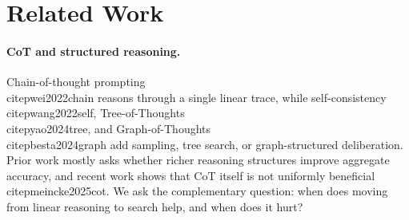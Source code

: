 \documentclass{article}
\begin{document}


\section{Related Work}
\label{sec:related}

\paragraph{CoT and structured reasoning.}
Chain-of-thought prompting~\\citep{wei2022chain} reasons through a single linear trace, while self-consistency~\\citep{wang2022self}, Tree-of-Thoughts~\\citep{yao2024tree}, and Graph-of-Thoughts~\\citep{besta2024graph} add sampling, tree search, or graph-structured deliberation. Prior work mostly asks whether richer reasoning structures improve aggregate accuracy, and recent work shows that CoT itself is not uniformly beneficial~\\citep{meincke2025cot}. We ask the complementary question: when does moving from linear reasoning to search help, and when does it hurt?
\end{document}
